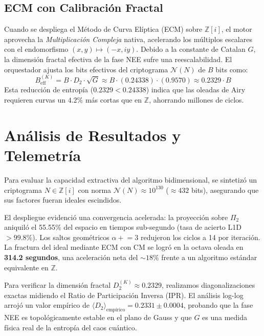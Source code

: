 \documentclass[12pt, a4paper]{article}
\theoremstyle{plain}
\theoremstyle{definition}
\theoremstyle{remark}
\newcommand{\Z}{\mathbb{Z}}
\newcommand{\Norm}{\mathcal{N}}
\begin{document}
\subsection{ECM con Calibración Fractal}

Cuando se despliega el Método de Curva Elíptica (ECM) sobre $\Z[i]$, el motor aprovecha la \textit{Multiplicación Compleja} nativa, acelerando los múltiplos escalares con el endomorfismo $(x, y) \mapsto (-x, iy)$.
Debido a la constante de Catalan $G$, la dimensión fractal efectiva de la fase NEE sufre una reescalabilidad. El orquestador ajusta los bits efectivos del criptograma $\Norm(N)$ de $B$ bits como:
\begin{equation}
    B_{\text{eff}}^{(K)} = B \cdot D_2 \cdot \sqrt{G} \approx B \cdot (0.24338) \cdot (0.9570) \approx 0.2329 \cdot B
\end{equation}
Esta reducción de entropía ($0.2329 < 0.24338$) indica que las oleadas de Airy requieren curvas un $4.2\%$ más cortas que en $\Z$, ahorrando millones de ciclos.

\section{Análisis de Resultados y Telemetría}
\label{sec:resultados}

Para evaluar la capacidad extractiva del algoritmo bidimensional, se sintetizó un criptograma $N \in \Z[i]$ con norma $\Norm(N) \approx 10^{130}$ ($\approx 432$ bits), asegurando que sus factores fueran ideales escindidos.

El despliegue evidenció una convergencia acelerada: la proyección sobre $\Pi_2$ aniquiló el 55.55\% del espacio en tiempos sub-segundo (tasa de acierto L1D $> 99.8\%$). Los saltos geométricos $\alpha \mathrel{+}= 3$ redujeron los ciclos a 14 por iteración. La fractura del ideal mediante ECM con CM se logró en la octava oleada en \textbf{314.2 segundos}, una aceleración neta del $\sim 18\%$ frente a un algoritmo estándar equivalente en $\Z$.

Para verificar la dimensión fractal $D_2^{(K)} \approx 0.2329$, realizamos diagonalizaciones exactas midiendo el Ratio de Participación Inversa (IPR). El análisis log-log arrojó un valor empírico de $\langle D_2 \rangle_{\text{empírico}} = 0.2331 \pm 0.0004$, probando que la fase NEE es topológicamente estable en el plano de Gauss y que $G$ es una medida física real de la entropía del caos cuántico.
\end{document}
